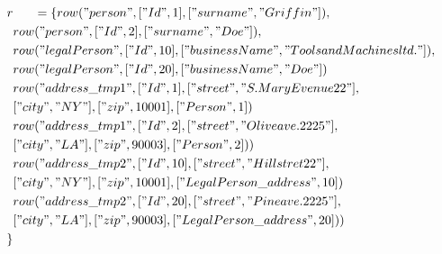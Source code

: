 \documentclass[11pt]{article}
\begin{document}
\begin{align*}
r & \;\;\;\;\;\; =\{ row("person", ["Id", 1], ["surname", "Griffin"]), \\
& row("person", ["Id", 2], ["surname", "Doe"]), \\
& row("legalPerson", ["Id", 10], ["businessName", "Tools and Machines ltd."]), \\
& row("legalPerson", ["Id", 20], ["businessName", "Doe"])\\
& row("address\_tmp1", ["Id", 1], ["street", "S. Mary Evenue 22"], \\ 
& ["city", "NY"], ["zip", 10001], ["Person", 1]) \\
& row("address\_tmp1", ["Id", 2], ["street", "Olive ave. 2225"], \\
& ["city", "LA"], ["zip", 90003], ["Person", 2]) )\\
& row("address\_tmp2", ["Id", 10], ["street", "Hill stret 22"], \\
& ["city", "NY"], ["zip", 10001], ["LegalPerson\_address", 10]) \\
& row("address\_tmp2", ["Id", 20], ["street", "Pine ave. 2225"], \\
& ["city", "LA"], ["zip", 90003], ["LegalPerson\_address", 20]) )\\
\}
\end{align*}
\end{document}
